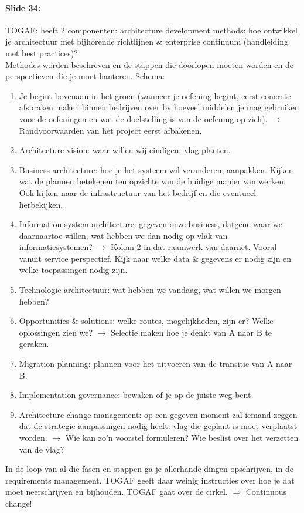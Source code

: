 \documentclass[10pt,a4paper]{report}
\begin{document}
\paragraph{Slide 34:}TOGAF: heeft 2 componenten: architecture development methods: hoe ontwikkel je architectuur met bijhorende richtlijnen \& enterprise continuum (handleiding met best practices)?\\
Methodes worden beschreven en de stappen die doorlopen moeten worden en de perspectieven die je moet hanteren. Schema: 
\begin{enumerate}
\item Je begint bovenaan in het groen (wanneer je oefening begint, eerst concrete afspraken maken binnen bedrijven over bv hoeveel middelen je mag gebruiken voor de oefeningen en wat de doelstelling is van de oefening op zich). $\rightarrow$ Randvoorwaarden van het project eerst afbakenen.
\item Architecture vision: waar willen wij eindigen: vlag planten.
\item Business architecture: hoe je het systeem wil veranderen, aanpakken. Kijken wat de plannen betekenen ten opzichte van de huidige manier van werken. Ook kijken naar de infrastructuur van het bedrijf en die eventueel herbekijken.
\item Information system architecture: gegeven onze business, datgene waar we daarnaartoe willen, wat hebben we dan nodig op vlak van informatiesystemen? $\rightarrow$ Kolom 2 in dat raamwerk van daarnet. Vooral vanuit service perspectief. Kijk naar welke data \& gegevens er nodig zijn en welke toepassingen nodig zijn.
\item Technologie architectuur: wat hebben we vandaag, wat willen we morgen hebben?
\item Opportunities \& solutions: welke routes, mogelijkheden, zijn er? Welke oplossingen zien we? $\rightarrow$ Selectie maken hoe je denkt van A naar B te geraken.
\item Migration planning: plannen voor het uitvoeren van de transitie van A naar B.
\item Implementation governance: bewaken of je op de juiste weg bent.
\item Architecture change management: op een gegeven moment zal iemand zeggen dat de strategie aanpassingen nodig heeft: vlag die geplant is moet verplaatst worden. $\rightarrow$ Wie kan zo'n voorstel formuleren? Wie beslist over het verzetten van de vlag?
\end{enumerate}
In de loop van al die fasen en stappen ga je allerhande dingen opschrijven, in de requirements management. TOGAF geeft daar weinig instructies over hoe je dat moet neerschrijven en bijhouden. TOGAF gaat over de cirkel. $\Rightarrow$ Continuous change!
\end{document}
